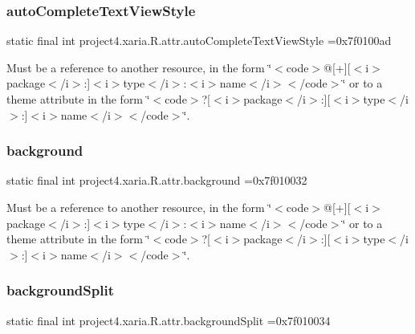\subsubsection{\texorpdfstring{auto\+Complete\+Text\+View\+Style}{autoCompleteTextViewStyle}}
{\footnotesize\ttfamily static final int project4.\+xaria.\+R.\+attr.\+auto\+Complete\+Text\+View\+Style =0x7f0100ad\hspace{0.3cm}{\ttfamily [static]}}

Must be a reference to another resource, in the form \char`\"{}$<$code$>$@\mbox{[}+\mbox{]}\mbox{[}$<$i$>$package$<$/i$>$\+:\mbox{]}$<$i$>$type$<$/i$>$\+:$<$i$>$name$<$/i$>$$<$/code$>$\char`\"{} or to a theme attribute in the form \char`\"{}$<$code$>$?\mbox{[}$<$i$>$package$<$/i$>$\+:\mbox{]}\mbox{[}$<$i$>$type$<$/i$>$\+:\mbox{]}$<$i$>$name$<$/i$>$$<$/code$>$\char`\"{}. \mbox{\label{classproject4_1_1xaria_1_1R_1_1attr_adf477a84cb6f593e955bd713a08db04e}} 
\subsubsection{\texorpdfstring{background}{background}}
{\footnotesize\ttfamily static final int project4.\+xaria.\+R.\+attr.\+background =0x7f010032\hspace{0.3cm}{\ttfamily [static]}}

Must be a reference to another resource, in the form \char`\"{}$<$code$>$@\mbox{[}+\mbox{]}\mbox{[}$<$i$>$package$<$/i$>$\+:\mbox{]}$<$i$>$type$<$/i$>$\+:$<$i$>$name$<$/i$>$$<$/code$>$\char`\"{} or to a theme attribute in the form \char`\"{}$<$code$>$?\mbox{[}$<$i$>$package$<$/i$>$\+:\mbox{]}\mbox{[}$<$i$>$type$<$/i$>$\+:\mbox{]}$<$i$>$name$<$/i$>$$<$/code$>$\char`\"{}. \mbox{\label{classproject4_1_1xaria_1_1R_1_1attr_acfe528f122298887ad04e87f1121e268}} 
\subsubsection{\texorpdfstring{background\+Split}{backgroundSplit}}
{\footnotesize\ttfamily static final int project4.\+xaria.\+R.\+attr.\+background\+Split =0x7f010034\hspace{0.3cm}{\ttfamily [static]}}

